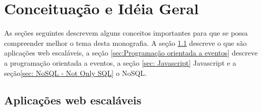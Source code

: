 \chapter{Conceituação e Idéia Geral}
\label{cha: Conceituação e Idéia Geral}

As seções seguintes descrevem alguns conceitos importantes para que se possa compreender melhor o tema desta monografia. A seção  \ref{sec: Aplicações web escaláveis} descreve o que são aplicações web escaláveis, a seção \ref{sec:Programação orientada a eventos} descreve a programação orientada a eventos, a seção \ref{sec: Javascript} Javascript e a  seção\ref{sec: NoSQL - Not Only SQL} o NoSQL.


\section{Aplicações web escaláveis}
\label{sec: Aplicações web escaláveis}
